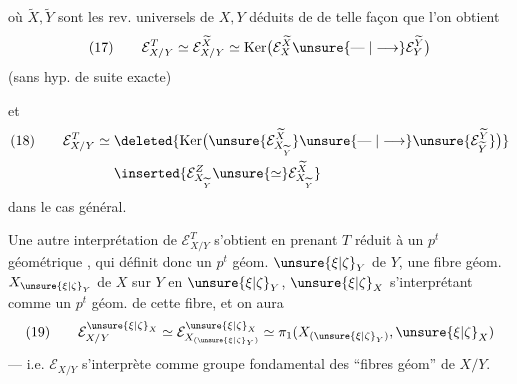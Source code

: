 
où $\widetilde X,\widetilde Y$ sont les rev. universels de $X,Y$ déduits de  de telle façon que l'on obtient
\[
(17)\qquad \mathcal E_{X/Y}^T\simeq\mathcal E_{X/Y}^{\widetilde X}\simeq\operatorname{Ker}\bigl(\mathcal E_X^{\widetilde X}\unsure{\mathrel{\text{---}}|\longrightarrow}\mathcal E_Y^{\widetilde Y}\bigr)
\]
(sans hyp. de suite exacte)

et
\[
\begin{aligned}
(18)\qquad \mathcal E_{X/Y}^T\simeq{}&\deleted{\operatorname{Ker}\bigl(\unsure{\mathcal E_{X_{\widetilde Y}}^{\widetilde X}}\unsure{\mathrel{\text{---}}|\longrightarrow}\unsure{\mathcal E_{\widetilde Y}^{\widetilde Y}}\bigr)}\\
&\inserted{\mathcal E_{X_{\widetilde Y}}^Z\unsure{\simeq}\mathcal E_{X_{\widetilde Y}}^{\widetilde X}}
\end{aligned}
\]
dans le cas général.


Une autre interprétation de $\mathcal E_{X/Y}^T$ s'obtient en prenant $T$ réduit à un $p^t$ géométrique , qui définit donc un $p^t$ géom. $\unsure{\xi|\zeta}_Y$ de $Y$, une fibre géom. $X_{\unsure{\xi|\zeta}_Y}$ de $X$ sur $Y$ en $\unsure{\xi|\zeta}_Y$, $\unsure{\xi|\zeta}_X$ s'interprétant comme un $p^t$ géom. de cette fibre, et on aura
\[
(19)\qquad \mathcal E_{X/Y}^{\unsure{\xi|\zeta}_X}\simeq\mathcal E_{X_{(\unsure{\xi|\zeta}_Y)}}^{\unsure{\xi|\zeta}_X}\simeq\pi_1(X_{(\unsure{\xi|\zeta}_Y)},\unsure{\xi|\zeta}_X)
\]
--- i.e. $\mathcal E_{X/Y}$ s'interprète comme groupe fondamental des ``fibres géom'' de $X/Y$.

